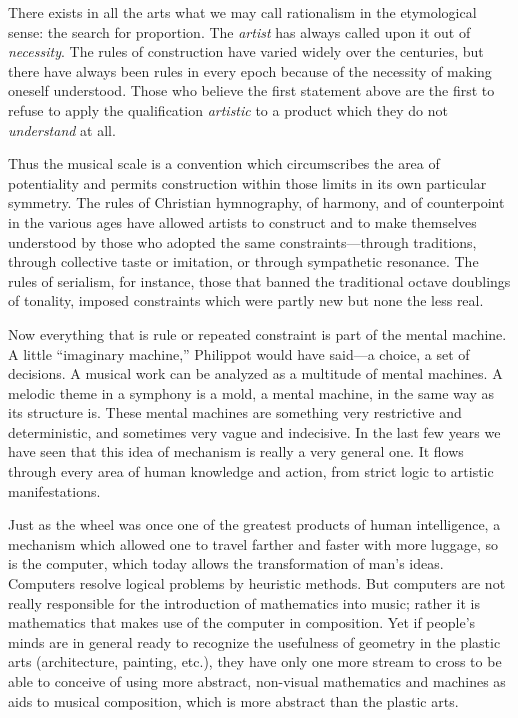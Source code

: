 \documentclass[letterpaper, 11pt]{article}
\begin{document}
There exists in all the arts what we may call rationalism in the etymological sense: the search for
proportion. The \textit{artist} has always called upon it out of \textit{necessity}. The rules of
construction have varied widely over the centuries, but there have always been rules in every epoch
because of the necessity of making oneself understood. Those who believe the first statement above
are the first to refuse to apply the qualification \textit{artistic} to a product which they do not
\textit{understand} at all.

Thus the musical scale is a convention which circumscribes the area of potentiality and permits
construction within those limits in its own particular symmetry. The rules of Christian hymnography,
of harmony, and of counterpoint in the various ages have allowed artists to construct and to make
themselves understood by those who adopted the same constraints---through traditions, through
collective taste or imitation, or through sympathetic resonance. The rules of serialism, for
instance, those that banned the traditional octave doublings of tonality, imposed constraints which
were partly new but none the less real.

Now everything that is rule or repeated constraint is part of the mental machine. A little
``imaginary machine,'' Philippot would have said---a choice, a set of decisions. A musical work can
be analyzed as a multitude of mental machines. A melodic theme in a symphony is a mold, a mental
machine, in the same way as its structure is. These mental machines are something very restrictive
and deterministic, and sometimes very vague and indecisive. In the last few years we have seen that
this idea of mechanism is really a very general one. It flows through every area of human knowledge
and action, from strict logic to artistic manifestations.

Just as the wheel was once one of the greatest products of human intelligence, a mechanism which
allowed one to travel farther and faster with more luggage, so is the computer, which today allows
the transformation of man's ideas. Computers resolve logical problems by heuristic methods. But
computers are not really responsible for the introduction of mathematics into music; rather it is
mathematics that makes use of the computer in composition. Yet if people's minds are in general
ready to recognize the usefulness of geometry in the plastic arts (architecture, painting, etc.),
they have only one more stream to cross to be able to conceive of using more abstract, non-visual
mathematics and machines as aids to musical composition, which is more abstract than the plastic
arts.
\end{document}
